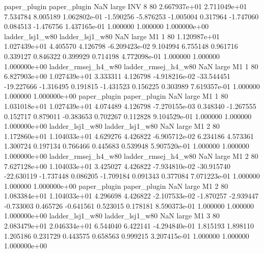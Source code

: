        paper_plugin        paper_plugin                   NaN      large      INV                 8 80 2.667937e+01   2.711049e+01      7.534784       8.005189  1.062802e-01     -1.590256     -5.876253    -1.005004       0.317964 -1.747060   0.084513    -1.476756   1.437165e-01            1.000000        1.000000        1.000000e+00
    ladder_lsj1_w80     ladder_lsj1_w80                   NaN      large       M1                 1 80 1.120987e+01   1.027439e+01      4.405570       4.126798 -6.209423e-02      9.104994      6.755148     0.961716       0.339127  0.846322   0.399929     0.714198   4.772098e-01            1.000000        1.000000        1.000000e+00
ladder_rmsej_h4_w80 ladder_rmsej_h4_w80                   NaN      large       M1                 1 80 6.827903e+00   1.027439e+01      3.333311       4.126798 -4.918216e-02    -33.544451    -19.227666    -1.316495       0.191815 -1.431523   0.156225     0.303989   7.619357e-01            1.000000        1.000000        1.000000e+00
       paper_plugin        paper_plugin                   NaN      large       M1                 1 80 1.031018e+01   1.027439e+01      4.074489       4.126798 -7.270155e-03      0.348340     -1.267555     0.152717       0.879011 -0.383653   0.702267     0.112828   9.104529e-01            1.000000        1.000000        1.000000e+00
    ladder_lsj1_w80     ladder_lsj1_w80                   NaN      large       M1                 2 80 1.172860e+01   1.104033e+01      4.629276       4.426822 -6.905712e-02      6.234186      4.573361     1.300724       0.197134  0.766466   0.445683     0.539948   5.907520e-01            1.000000        1.000000        1.000000e+00
ladder_rmsej_h4_w80 ladder_rmsej_h4_w80                   NaN      large       M1                 2 80 7.627128e+00   1.104033e+01      3.425027       4.426822 -7.934810e-02    -30.915740    -22.630119    -1.737448       0.086205 -1.709184   0.091343     0.377084   7.071223e-01            1.000000        1.000000        1.000000e+00
       paper_plugin        paper_plugin                   NaN      large       M1                 2 80 1.083384e+01   1.104033e+01      4.296698       4.426822 -2.107533e-02     -1.870257     -2.939447    -0.733003       0.465726 -0.641561   0.523015     0.178181   8.590373e-01            1.000000        1.000000        1.000000e+00
    ladder_lsj1_w80     ladder_lsj1_w80                   NaN      large       M1                 3 80 2.083479e+01   2.046334e+01      6.544040       6.422141 -4.294840e-01      1.815193      1.898110     1.205186       0.231729  0.443575   0.658563     0.999215   3.207415e-01            1.000000        1.000000        1.000000e+00
